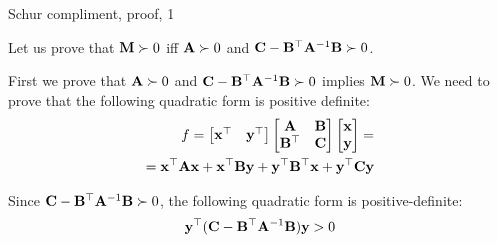 \documentclass{beamer}
\begin{document}
\begin{frame}{Schur compliment, proof, 1}
		\begin{flushleft}
			
			Let us prove that $\mathbf{M} \succ 0$ iff $\mathbf{A} \succ 0$ and $\mathbf{C} - \mathbf{B}^\top\mathbf{A}^{-1}\mathbf{B} \succ 0$.
			
			\bigskip
			
			First we prove that $\mathbf{A} \succ 0$ and $\mathbf{C} - \mathbf{B}^\top\mathbf{A}^{-1}\mathbf{B} \succ 0$ implies $\mathbf{M} \succ 0$. We need to prove that the following quadratic form is positive definite:
			\begin{align}
				f = 
				\begin{bmatrix}
					\mathbf{x}^\top & 
					\mathbf{y}^\top
				\end{bmatrix}
				\begin{bmatrix}
					\mathbf{A} & \mathbf{B} \\
					\mathbf{B}^\top & \mathbf{C}
				\end{bmatrix}
				\begin{bmatrix}
					\mathbf{x} \\ 
					\mathbf{y}
				\end{bmatrix} = \\
				= 
				\mathbf{x}^\top \mathbf{A}\mathbf{x} + \mathbf{x}^\top \mathbf{B} \mathbf{y} + \mathbf{y}^\top \mathbf{B}^\top \mathbf{x} + \mathbf{y}^\top \mathbf{C} \mathbf{y}  
			\end{align}
			
			Since $\mathbf{C} - \mathbf{B}^\top\mathbf{A}^{-1}\mathbf{B} \succ 0$, the following quadratic form is positive-definite:
			\begin{align}
				\mathbf{y}^\top (\mathbf{C} - \mathbf{B}^\top\mathbf{A}^{-1}\mathbf{B} ) \mathbf{y} > 0
			\end{align}
			
			
			
		\end{flushleft}
	\end{frame}
	
\end{document}
